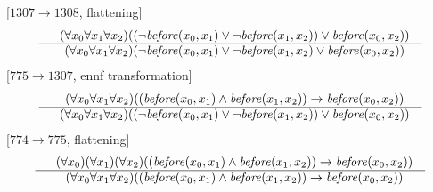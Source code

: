 \documentclass[border=10pt,preview,multi,varwidth=\maxdimen]{standalone}
\newenvironment{VampireStep}{}{}
\newenvironment{VampireInference}{%
   \begin{array}{c}}{\end{array}}
\newenvironment{VampirePremise}%
   {\begin{array}{l}}%
   {\end{array}}
\newenvironment{VampireConclusion}%
   {\begin{array}{l}}%
   {\end{array}}
\newcommand{\VConclusionSeparator}{\\ \hline}
\newcommand{\Vor}{\vee}
\newcommand{\Vand}{\wedge}
\newcommand{\Vimp}{\rightarrow}
\begin{document}
\begin{VampireStep}
[$1307\rightarrow 1308$, flattening]\\
\[\begin{VampireInference}
\begin{VampirePremise}%
~~(\forall x_{0} \forall x_{1} \forall x_{2} )((\neg \mathit{before} (x_{0},x_{1}) \Vor \neg \mathit{before} (x_{1},x_{2})) \Vor \mathit{before} (x_{0},x_{2}))
\end{VampirePremise}
\VConclusionSeparator
\begin{VampireConclusion}
~~(\forall x_{0} \forall x_{1} \forall x_{2} )(\neg \mathit{before} (x_{0},x_{1}) \Vor \neg \mathit{before} (x_{1},x_{2}) \Vor \mathit{before} (x_{0},x_{2}))
\end{VampireConclusion}
\end{VampireInference}
\]
\end{VampireStep}
\begin{VampireStep}
[$775\rightarrow 1307$, ennf transformation]\\
\[\begin{VampireInference}
\begin{VampirePremise}%
~~(\forall x_{0} \forall x_{1} \forall x_{2} )((\mathit{before} (x_{0},x_{1}) \Vand \mathit{before} (x_{1},x_{2})) \Vimp \mathit{before} (x_{0},x_{2}))
\end{VampirePremise}
\VConclusionSeparator
\begin{VampireConclusion}
~~(\forall x_{0} \forall x_{1} \forall x_{2} )((\neg \mathit{before} (x_{0},x_{1}) \Vor \neg \mathit{before} (x_{1},x_{2})) \Vor \mathit{before} (x_{0},x_{2}))
\end{VampireConclusion}
\end{VampireInference}
\]
\end{VampireStep}
\begin{VampireStep}
[$774\rightarrow 775$, flattening]\\
\[\begin{VampireInference}
\begin{VampirePremise}%
~~(\forall x_{0} )(\forall x_{1} )(\forall x_{2} )((\mathit{before} (x_{0},x_{1}) \Vand \mathit{before} (x_{1},x_{2})) \Vimp \mathit{before} (x_{0},x_{2}))
\end{VampirePremise}
\VConclusionSeparator
\begin{VampireConclusion}
~~(\forall x_{0} \forall x_{1} \forall x_{2} )((\mathit{before} (x_{0},x_{1}) \Vand \mathit{before} (x_{1},x_{2})) \Vimp \mathit{before} (x_{0},x_{2}))
\end{VampireConclusion}
\end{VampireInference}
\]
\end{VampireStep}
\end{document}

